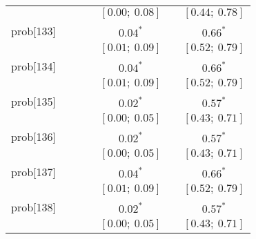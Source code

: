 \begin{table}
\begin{center}
\begin{tabular}{l c c c c c c }
          &                           &                           &                           & $[0.00;\ 0.08]$         &                           & $[0.44;\ 0.78]$       \\
prob[133] &                           &                           &                           & $0.04^{*}$              &                           & $0.66^{*}$            \\
          &                           &                           &                           & $[0.01;\ 0.09]$         &                           & $[0.52;\ 0.79]$       \\
prob[134] &                           &                           &                           & $0.04^{*}$              &                           & $0.66^{*}$            \\
          &                           &                           &                           & $[0.01;\ 0.09]$         &                           & $[0.52;\ 0.79]$       \\
prob[135] &                           &                           &                           & $0.02^{*}$              &                           & $0.57^{*}$            \\
          &                           &                           &                           & $[0.00;\ 0.05]$         &                           & $[0.43;\ 0.71]$       \\
prob[136] &                           &                           &                           & $0.02^{*}$              &                           & $0.57^{*}$            \\
          &                           &                           &                           & $[0.00;\ 0.05]$         &                           & $[0.43;\ 0.71]$       \\
prob[137] &                           &                           &                           & $0.04^{*}$              &                           & $0.66^{*}$            \\
          &                           &                           &                           & $[0.01;\ 0.09]$         &                           & $[0.52;\ 0.79]$       \\
prob[138] &                           &                           &                           & $0.02^{*}$              &                           & $0.57^{*}$            \\
          &                           &                           &                           & $[0.00;\ 0.05]$         &                           & $[0.43;\ 0.71]$       \\

\end{tabular}
\end{center}
\end{table}

